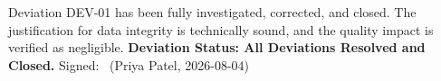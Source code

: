 \begin{verdictbox}
Deviation DEV-01 has been fully investigated, corrected, and closed. The justification for data integrity is technically sound, and the quality impact is verified as negligible.
\textbf{Deviation Status: All Deviations Resolved and Closed.} Signed: \makebox[3.0cm]{\hrulefill}\ (Priya Patel, 2026-08-04)
\end{verdictbox}
